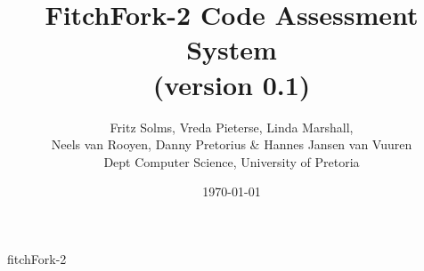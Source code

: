 \documentclass[titlepage]{book}
\title{FitchFork-2 Code Assessment System \\
          (version 0.1)}
\author{Fritz Solms, Vreda Pieterse, Linda Marshall, \\ Neels van Rooyen, Danny Pretorius \& Hannes Jansen van Vuuren \\ Dept Computer Science, University of Pretoria}
\date{\today}
\begin{document}
\maketitle

\tableofcontents

\newpage

{fitchFork-2}
\end{document}
